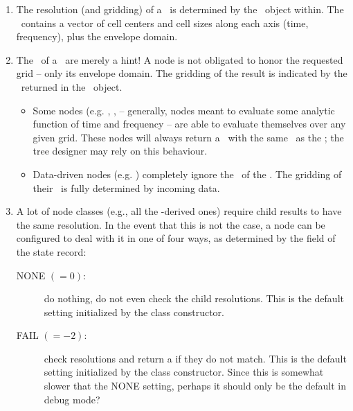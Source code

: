 \documentclass[10pt,twoside]{book}
\begin{document}
  \begin{enumerate}
  
  \item The resolution (and gridding) of a \Request\ is determined by the
  \Cells\ object within. The \Cells\ contains a vector of cell centers and cell
  sizes along each axis (time, frequency), plus the envelope domain. 

  \item The \Cells\ of a \Request\ are merely a hint! A node is not obligated
  to honor the requested grid -- only its envelope domain. The gridding of the
  result is indicated by the \Cells\ returned in the \Result\ object.

    \begin{itemize} 

    \item Some nodes (e.g. , ,  -- generally, nodes
    meant to evaluate some analytic function of time and frequency -- are able
    to evaluate themselves over any given grid. These nodes will always return
    a \Result\ with the same \Cells\ as the \Request; the tree designer may
    rely on this behaviour.

    \item Data-driven nodes (e.g. ) completely ignore the \Cells\
    of the \Request. The gridding of their \Result\ is fully determined by
    incoming data.

    \end{itemize}
    
  \item A lot of node classes (e.g., all the -derived ones)
  require child results to have the same resolution. In the event that this is
  not the case, a node can be configured to deal with it in one of four ways,
  as determined by the \qq{auto\_resample} field of the state record:

    \begin{description}
    
    \item[NONE $(=0)$:] do nothing, do not even check the child resolutions. This
    is the default setting initialized by the \qq{Node} class constructor.

    \item[FAIL $(=-2)$:] check resolutions and return a  if they do
    not match. This is the default setting  initialized by the \qq{Function}
    class constructor. Since this is somewhat slower that the NONE setting, 
    perhaps it should only be the default in debug mode?
    

\end{description}
\end{enumerate}
\end{document}
